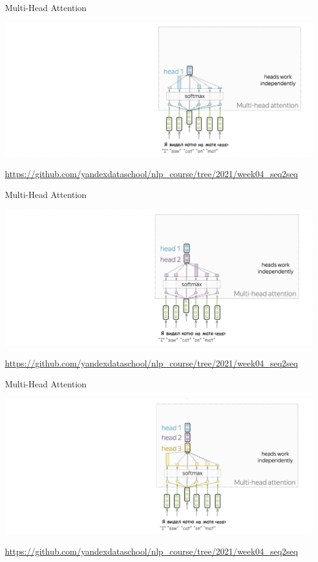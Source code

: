 \documentclass[notes,12pt, aspectratio=169]{beamer}
\begin{document}
\begin{frame}{Multi-Head Attention} 
	\begin{center}
		\includegraphics[width=.99\linewidth]{mh1.png}
	\end{center}
	\vfill
\footnotesize  {\color{blue} \url{https://github.com/yandexdataschool/nlp_course/tree/2021/week04_seq2seq}} 
\end{frame}


\begin{frame}{Multi-Head Attention} 
	\begin{center}
		\includegraphics[width=.99\linewidth]{mh2.png}
	\end{center}
	\vfill
\footnotesize  {\color{blue} \url{https://github.com/yandexdataschool/nlp_course/tree/2021/week04_seq2seq}} 
\end{frame}


\begin{frame}{Multi-Head Attention} 
	\begin{center}
		\includegraphics[width=.99\linewidth]{mh3.png}
	\end{center}
	\vfill
\footnotesize  {\color{blue} \url{https://github.com/yandexdataschool/nlp_course/tree/2021/week04_seq2seq}} 
\end{frame}
\end{document}
